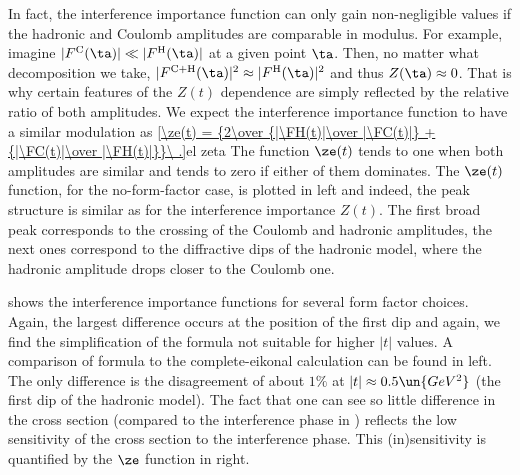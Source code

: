
In fact, the interference importance function can only gain non-negligible values if the hadronic and Coulomb amplitudes are comparable in modulus. For example, imagine $|\FC(\ta)| \ll |\FH(\ta)|$ at a given point $\ta$. Then, no matter what decomposition  we take, $|\FCH(\ta)|^2 \approx |\FH(\ta)|^2$ and thus $Z(\ta) \approx 0$. That is why certain features of the $Z(t)$ dependence are simply reflected by the relative ratio of both amplitudes. We expect the interference importance function to have a similar modulation as 
\eqref{\ze(t) = {2\over {|\FH(t)|\over |\FC(t)|} + {|\FC(t)|\over |\FH(t)|}}\ .}{el zeta}
The function $\ze(t)$ tends to one when both amplitudes are similar and tends to zero if either of them dominates. The $\ze(t)$ function, for the no-form-factor case, is plotted in  left and indeed, the peak structure is similar as for the interference importance $Z(t)$. The first broad peak corresponds to the crossing of the Coulomb and hadronic amplitudes, the next ones correspond to the diffractive dips of the hadronic model, where the hadronic amplitude drops closer to the Coulomb one.

 shows the interference importance functions for several form factor choices. Again, the largest difference occurs at the position of the first dip and again, we find the simplification of the \WaY{} formula not suitable for higher $|t|$ values. A comparison of \KL{} formula to the complete-eikonal calculation can be found in  left. The only difference is the disagreement of about $1\%$ at $|t| \approx 0.5\un{GeV^2}$ (the first dip of the hadronic model). The fact that one can see so little difference in the cross section (compared to the interference phase in ) reflects the low sensitivity of the cross section to the interference phase. This (in)sensitivity is quantified by the $\ze$ function in  right.



